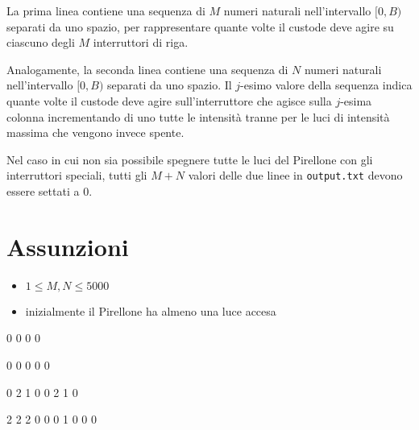 La prima linea contiene una sequenza di $M$ numeri naturali nell'intervallo $[0,B)$ separati da uno spazio, per rappresentare quante volte il custode deve agire su ciascuno degli $M$ interruttori di riga.

Analogamente, la seconda linea contiene una sequenza di $N$
numeri naturali nell'intervallo $[0,B)$ separati da uno spazio.
Il  $j$-esimo valore della sequenza indica quante volte
il custode deve agire sull'interruttore che agisce sulla $j$-esima colonna incrementando di uno tutte le intensità tranne per le luci di intensità massima che vengono invece spente.

Nel caso in cui non sia possibile spegnere tutte le luci del Pirellone
con gli interruttori speciali, tutti gli $M+N$ valori delle due linee in
\texttt{output.txt} devono essere settati a $0$.

  \section*{Assunzioni}
  \begin{itemize}
  
    \item $ 1 \leq M, N \leq 5000$
    \item  inizialmente il Pirellone ha almeno una luce accesa
  \end{itemize}



{
0 0 0 0

0 0 0 0 0
}

{
0 2 1 0 0 2 1 0

2 2 2 0 0 0 1 0 0 0
}



